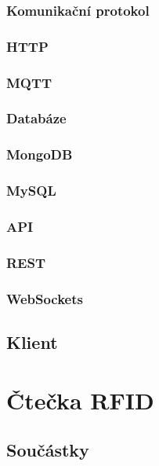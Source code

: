 \documentclass[czech,BP]{thesiskiv}
\begin{document}
		\subsection{Komunikační protokol}
			\subsection{HTTP}
		
			\subsection{MQTT}
	
		\subsection{Databáze}
			\subsection{MongoDB}
		
			\subsection{MySQL}
	
		\subsection{API}
			\subsection{REST}
		
			\subsection{WebSockets}
		
	\section{Klient}
	
	

\chapter{Čtečka RFID}

	\section{Součástky}
\end{document}
